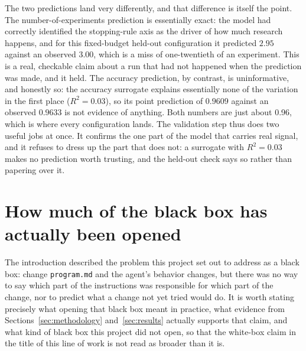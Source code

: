 \documentclass[11pt]{article}
\begin{document}
The two predictions land very differently, and that difference is itself the point. The number-of-experiments prediction is essentially exact: the model had correctly identified the stopping-rule axis as the driver of how much research happens, and for this fixed-budget held-out configuration it predicted $2.95$ against an observed $3.00$, which is a miss of one-twentieth of an experiment. This is a real, checkable claim about a run that had not happened when the prediction was made, and it held. The accuracy prediction, by contrast, is uninformative, and honestly so: the accuracy surrogate explains essentially none of the variation in the first place ($R^2=0.03$), so its point prediction of $0.9609$ against an observed $0.9633$ is not evidence of anything. Both numbers are just about 0.96, which is where every configuration lands. The validation step thus does two useful jobs at once. It confirms the one part of the model that carries real signal, and it refuses to dress up the part that does not: a surrogate with $R^2=0.03$ makes no prediction worth trusting, and the held-out check says so rather than papering over it.

\section{How much of the black box has actually been opened}
\label{sec:blackbox}

The introduction described the problem this project set out to address as a black box: change \texttt{program.md} and the agent's behavior changes, but there was no way to say which part of the instructions was responsible for which part of the change, nor to predict what a change not yet tried would do. It is worth stating precisely what opening that black box meant in practice, what evidence from Sections~\ref{sec:methodology} and~\ref{sec:results} actually supports that claim, and what kind of black box this project did not open, so that the white-box claim in the title of this line of work is not read as broader than it is.
\end{document}
